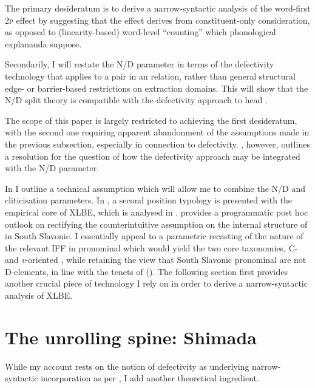\documentclass[output=paper]{langsci/langscibook}
\begin{document}
The primary desideratum is to derive a narrow-syntactic analysis of the
word-first \textsc{2p} effect by suggesting that the effect derives from
constituent-only consideration, as opposed to (linearity-based) word-level
\enquote{counting} which phonological explananda suppose.

Secondarily, I will restate the N/D parameter in terms of the defectivity
technology that applies to a pair in an  relation, rather than general
structural edge- or barrier-based restrictions on extraction domains.  This
will show that the N/D split theory is compatible with the defectivity approach
to head .

The scope of this paper is largely restricted to achieving the first
desideratum, with the second one requiring apparent abandonment of the
assumptions made in the previous subsection, especially in connection to
defectivity. , however, outlines a resolution for the
question of how the defectivity approach may be integrated with the N/D
parameter.

In  I outline a technical assumption which will allow me to
combine the N/D and cliticisation parameters. In , a second
position typology is presented with the empirical core of XLBE, which is
analysed in .  provides a programmatic post hoc
outlook on rectifying the counterintuitive assumption on the internal structure
of  in South Slavonic. I essentially appeal to a parametric recasting of
the nature of the relevant \gls{IFF} in pronominal  which would yield
the two core taxonomies, C- and \emph{v}-oriented , while
retaining the view that South Slavonic pronominal  are not
D-elements, in line with the tenets of \citeauthor{Boskovic:2001b}
(\citeyear{Boskovic:2001b,Boskovic:2004c,Boskovic:2005,Boskovic:2009b}).  The
following section first provides another crucial piece of technology I rely on
in order to derive a narrow-syntactic analysis of XLBE.

\section{The unrolling spine: Shimada
\citeyearpar{Shimada:2007}}\label{sec:shimada}

While my account rests on the notion of defectivity as underlying
nar\-row-syn\-tac\-tic incorporation as per \citet{Roberts2010}, I add another
theoretical ingredient.
\end{document}
